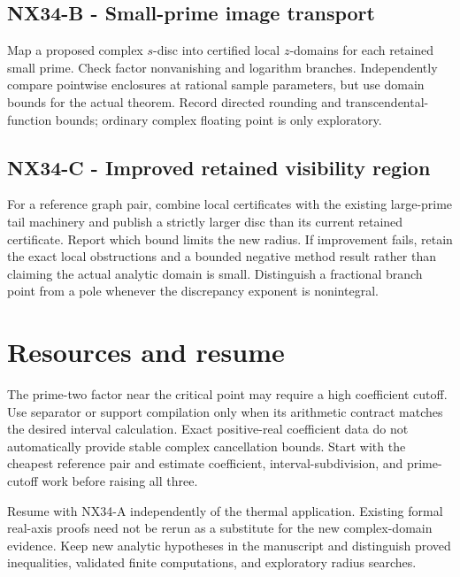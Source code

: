 \documentclass[
  11pt,
  a4paper,
]{report}
\begin{document}
\hypertarget{nx34-b---small-prime-image-transport}{%
\subsection{NX34-B - Small-prime image
transport}\label{nx34-b---small-prime-image-transport}}

Map a proposed complex \(s\)-disc into certified local \(z\)-domains for
each retained small prime. Check factor nonvanishing and logarithm
branches. Independently compare pointwise enclosures at rational sample
parameters, but use domain bounds for the actual theorem. Record
directed rounding and transcendental-function bounds; ordinary complex
floating point is only exploratory.

\hypertarget{nx34-c---improved-retained-visibility-region}{%
\subsection{NX34-C - Improved retained visibility
region}\label{nx34-c---improved-retained-visibility-region}}

For a reference graph pair, combine local certificates with the existing
large-prime tail machinery and publish a strictly larger disc than its
current retained certificate. Report which bound limits the new radius.
If improvement fails, retain the exact local obstructions and a bounded
negative method result rather than claiming the actual analytic domain
is small. Distinguish a fractional branch point from a pole whenever the
discrepancy exponent is nonintegral.

\hypertarget{resources-and-resume}{%
\section{Resources and resume}\label{resources-and-resume}}

The prime-two factor near the critical point may require a high
coefficient cutoff. Use separator or support compilation only when its
arithmetic contract matches the desired interval calculation. Exact
positive-real coefficient data do not automatically provide stable
complex cancellation bounds. Start with the cheapest reference pair and
estimate coefficient, interval-subdivision, and prime-cutoff work before
raising all three.

Resume with NX34-A independently of the thermal application. Existing
formal real-axis proofs need not be rerun as a substitute for the new
complex-domain evidence. Keep new analytic hypotheses in the manuscript
and distinguish proved inequalities, validated finite computations, and
exploratory radius searches.
\end{document}

